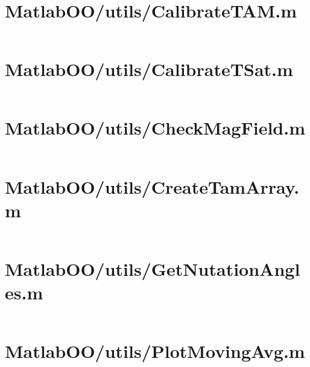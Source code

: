 \pagebreak
\section{MatlabOO/utils/CalibrateTAM.m}\label{code:MatlabOO/utils/CalibrateTAM.m}
\inputminted[linenos,fontsize=\scriptsize]{matlab}{/home/dcouture/git/mathyourlife/TSatPy/beta_versions/matlab_object_oriented/utils/CalibrateTAM.m}

\pagebreak
\section{MatlabOO/utils/CalibrateTSat.m}\label{code:MatlabOO/utils/CalibrateTSat.m}
\inputminted[linenos,fontsize=\scriptsize]{matlab}{/home/dcouture/git/mathyourlife/TSatPy/beta_versions/matlab_object_oriented/utils/CalibrateTSat.m}

\pagebreak
\section{MatlabOO/utils/CheckMagField.m}\label{code:MatlabOO/utils/CheckMagField.m}
\inputminted[linenos,fontsize=\scriptsize]{matlab}{/home/dcouture/git/mathyourlife/TSatPy/beta_versions/matlab_object_oriented/utils/CheckMagField.m}

\pagebreak
\section{MatlabOO/utils/CreateTamArray.m}\label{code:MatlabOO/utils/CreateTamArray.m}
\inputminted[linenos,fontsize=\scriptsize]{matlab}{/home/dcouture/git/mathyourlife/TSatPy/beta_versions/matlab_object_oriented/utils/CreateTamArray.m}

\pagebreak
\section{MatlabOO/utils/GetNutationAngles.m}\label{code:MatlabOO/utils/GetNutationAngles.m}
\inputminted[linenos,fontsize=\scriptsize]{matlab}{/home/dcouture/git/mathyourlife/TSatPy/beta_versions/matlab_object_oriented/utils/GetNutationAngles.m}

\pagebreak
\section{MatlabOO/utils/PlotMovingAvg.m}\label{code:MatlabOO/utils/PlotMovingAvg.m}
\inputminted[linenos,fontsize=\scriptsize]{matlab}{/home/dcouture/git/mathyourlife/TSatPy/beta_versions/matlab_object_oriented/utils/PlotMovingAvg.m}

